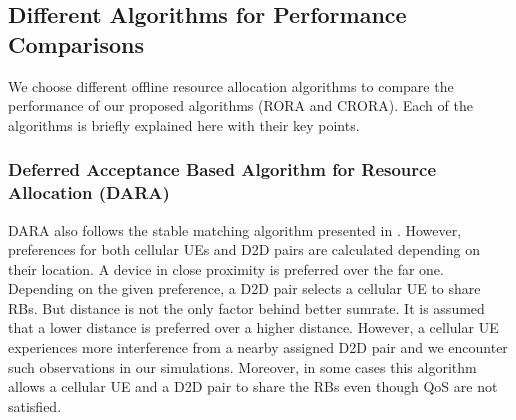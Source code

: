 \documentclass[times]{dacauth}
\begin{document}
\subsection{Different Algorithms for Performance Comparisons}
\noindent
We choose different offline resource allocation algorithms to compare the performance of our proposed algorithms (RORA and CRORA). Each of the algorithms is briefly explained here with their key points.

\subsubsection{Deferred Acceptance Based Algorithm for Resource Allocation (DARA)}
\noindent
DARA \cite{dara} also follows the stable matching algorithm presented in \cite{stable}. However, preferences for both cellular UEs and D2D pairs are calculated depending on their location. A device in close proximity is preferred over the far one. Depending on the given preference, a D2D pair selects a cellular UE to share RBs. But distance is not the only factor behind better sumrate. It is assumed that a lower distance is preferred over a higher distance. However, a cellular UE experiences more interference from a nearby assigned D2D pair and we encounter such observations in our simulations. Moreover, in some cases this algorithm allows a cellular UE and a D2D pair to share the RBs even though QoS are not satisfied.

\end{document}

